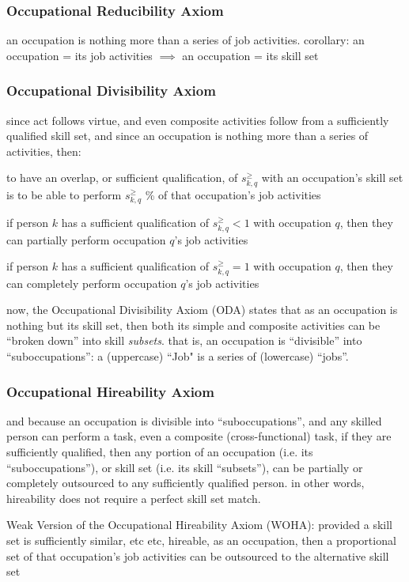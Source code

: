 \documentclass{elsarticle} %
\begin{document}
\subsubsection{Occupational Reducibility Axiom}
an occupation is nothing more than a series of job activities. corollary: an occupation = its job activities $\implies$ an occupation = its skill set

\subsubsection{Occupational Divisibility Axiom}
since act follows virtue, and even composite activities follow from a sufficiently qualified skill set, and since an occupation is nothing more than a series of activities, then:

to have an overlap, or sufficient qualification, of $s_{k,q}^{\geq}$ with an occupation's skill set is to be able to perform $s_{k,q}^{\geq}$ \% of that occupation's job activities

if person $k$ has a sufficient qualification of $s_{k,q}^{\geq} < 1$ with occupation $q$, then they can partially perform occupation $q$'s job activities

if person $k$ has a sufficient qualification of $s_{k,q}^{\geq} = 1$ with occupation $q$, then they can completely perform occupation $q$'s job activities

now, the Occupational Divisibility Axiom (ODA) states that as an occupation is nothing but its skill set, then both its simple and composite activities can be ``broken down'' into skill \textit{subsets}. that is, an occupation is ``divisible'' into ``suboccupations'': a (uppercase) ``Job" is a series of (lowercase) ``jobs''.

\subsubsection{Occupational Hireability Axiom}
and because an occupation is divisible into ``suboccupations'', and any skilled person can perform a task, even a composite (cross-functional) task, if they are sufficiently qualified, then any portion of an occupation (i.e. its ``suboccupations''), or skill set (i.e. its skill ``subsets''), can be partially or completely outsourced to any sufficiently qualified person. in other words, hireability does not require a perfect skill set match.

Weak Version of the Occupational Hireability Axiom (WOHA): provided a skill set is sufficiently similar, etc etc, hireable, as an occupation, then a proportional set of that occupation's job activities can be outsourced to the alternative skill set
\end{document}
